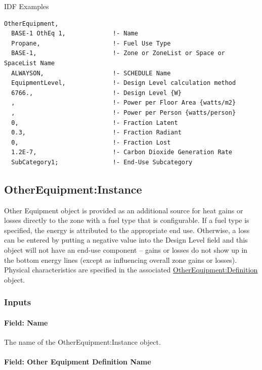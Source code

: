 IDF Examples

\begin{lstlisting}
OtherEquipment,
  BASE-1 OthEq 1,             !- Name
  Propane,                    !- Fuel Use Type
  BASE-1,                     !- Zone or ZoneList or Space or SpaceList Name
  ALWAYSON,                   !- SCHEDULE Name
  EquipmentLevel,             !- Design Level calculation method
  6766.,                      !- Design Level {W}
  ,                           !- Power per Floor Area {watts/m2}
  ,                           !- Power per Person {watts/person}
  0,                          !- Fraction Latent
  0.3,                        !- Fraction Radiant
  0,                          !- Fraction Lost
  1.2E-7,                     !- Carbon Dioxide Generation Rate
  SubCategory1;               !- End-Use Subcategory
\end{lstlisting}


\subsection{OtherEquipment:Instance}\label{otherequipmentinstance}

Other Equipment object is provided as an additional source for heat gains or losses directly to the zone with a fuel type that is configurable. If a fuel type is specified, the energy is attributed to the appropriate end use. Otherwise, a loss can be entered by putting a negative value into the Design Level field and this object will not have an end-use component -- gains or losses do not show up in the bottom energy lines (except as influencing overall zone gains or losses). Physical characteristics are specified in the associated \hyperref[otherequipmentdefinition]{OtherEquipment:Definition} object.

\subsubsection{Inputs}\label{inputs-8-010-other-instance}

\paragraph{Field: Name}\label{field-name-8-008-other-instance}

The name of the OtherEquipment:Instance object.

\paragraph{Field: Other Equipment Definition Name}\label{field-other-equipment-definition-name}

